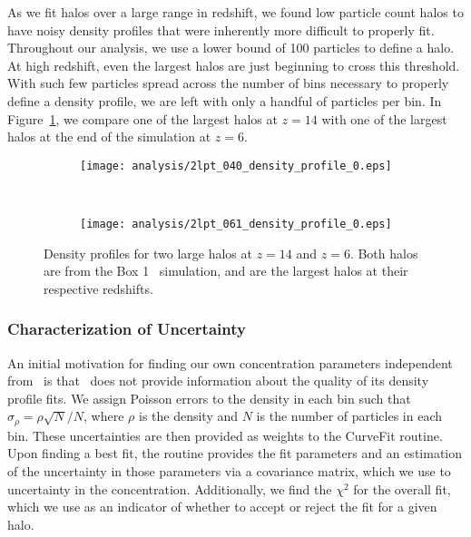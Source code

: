 As we fit halos over a large range in redshift, we found low particle count halos to have noisy density profiles that were inherently more difficult to properly fit.  Throughout our analysis, we use a lower bound of 100 particles to define a halo.  At high redshift, even the largest halos are just beginning to cross this threshold.  With such few particles spread across the number of bins necessary to properly define a density profile, we are left with only a handful of particles per bin.  In Figure~\ref{fig:fitting--density_profiles}, we compare one of the largest halos at $z = 14$ with one of the largest halos at the end of the simulation at $z = 6$.

\begin{figure}[t]
	\centering
	\begin{subfigure}{}
		\texttt{[image: analysis/2lpt\_040\_density\_profile\_0.eps]}
	\end{subfigure}
	\\
	\begin{subfigure}{}
		\texttt{[image: analysis/2lpt\_061\_density\_profile\_0.eps]}
	\end{subfigure}
	\caption[Density profiles for two large halos at $z = 14$ and $z = 6$.]{\footnotesize Density profiles for two large halos at $z = 14$ and $z = 6$.  Both halos are from the Box 1 \lpt\ simulation, and are the largest halos at their respective redshifts.  }
	\label{fig:fitting--density_profiles}
\end{figure}



\subsubsection{Characterization of Uncertainty}
\label{subsubsec:analysis--profile_fitting--uncertainty}


An initial motivation for finding our own concentration parameters independent from \rockstar\ is that \rockstar\ does not provide information about the quality of its density profile fits.  We assign Poisson errors to the density in each bin such that $\sigma_{\rho} = \rho \sqrt{N} / N$, where $\rho$ is the density and $N$ is the number of particles in each bin.  These uncertainties are then provided as weights to the CurveFit routine.  Upon finding a best fit, the routine provides the fit parameters and an estimation of the uncertainty in those parameters via a covariance matrix, which we use to uncertainty in the concentration.  Additionally, we find the $\chi^{2}$ for the overall fit, which we use as an indicator of whether to accept or reject the fit for a given halo.



